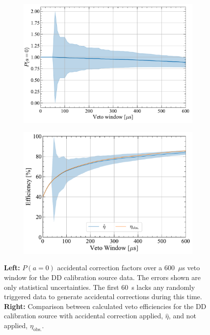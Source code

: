 \begin{figure}[!ht]
    \centering
    \begin{subfigure}[b]{0.49\textwidth}
        \centering
        \includegraphics[width=\textwidth]{figures/VetoEfficiency/SR3DDdirect_Corrections_100k.pdf}
        \caption{}
        \label{fig:VetoEff/DDAccCorrectionParameters}
    \end{subfigure}
    \hfill
    \begin{subfigure}[b]{0.49\textwidth}
        \centering
        \includegraphics[width=\textwidth]{figures/VetoEfficiency/DDAccidentalCheck.pdf}
        \caption{}
        \label{fig:VetoEff/DDAccCorrectionImpact_P0}
    \end{subfigure}
    \caption[$P(a=0)$ accidental correction factors over a 600~\textmu s for DD calibration sources alongside the veto efficiency with the corrections applied.]{\textbf{Left:} $P(a=0)$ accidental correction factors over a 600~$\mu$s veto window for the DD calibration source data. The errors shown are only statistical uncertainties. The first 60~\textmu s lacks any randomly triggered data to generate accidental corrections during this time. \textbf{Right:} Comparison between calculated veto efficiencies for the DD calibration source with accidental correction applied, $\hat{\eta}$, and not applied, $\eta_\text{obs.}$.}
    \label{fig:VetoEff/DDAccidentalPlots}
\end{figure}

